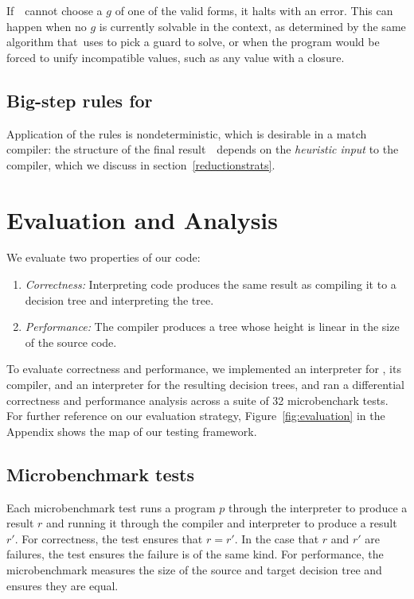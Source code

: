 \documentclass[runningheads]{llncs}
\begin{document}
    If~\Compile\ cannot choose a $g$ of one of the valid forms, it halts with an
    error. %
    This can happen when no $g$ is currently solvable in the context, as
    determined by the same algorithm that~\VMinus uses to pick a guard to solve,
    or when the program would be forced to unify incompatible values, such as
    any value with a closure. %

\subsection{Big-step rules for \Compile}

      \begingroup
      \compiler
      \endgroup

      Application of the rules is nondeterministic, which is desirable in a
      match compiler: the structure of the final result~\expr\ depends on the
      \textit{heuristic input} to the compiler, which we discuss in
      section~\ref{reductionstrats}. %


\section{Evaluation and Analysis}

We evaluate two properties of our code: 

\begin{enumerate}
  \item \textit{Correctness:} Interpreting \VMinus code produces the same result as
  compiling it to a decision tree and interpreting the tree. 
  \item \textit{Performance:} The compiler produces a tree whose height is
  linear in the size of the source code. 
\end{enumerate}


To evaluate correctness and performance, we implemented an interpreter for
\VMinus, its compiler, and an interpreter for the resulting decision trees, and
ran a differential correctness and performance analysis across a suite of 32
microbenchark tests. %
For further reference on our evaluation strategy, Figure~\ref{fig:evaluation} in
the Appendix shows the map of our testing framework. %

\subsection{Microbenchmark tests}

Each microbenchmark test runs a program $p$ through the \VMinus
interpreter to produce a result $r$ and running it through the \DTran compiler and
\D interpreter to produce a result $r'$. %
For correctness, the test ensures that $r = r'$. %
In the case that $r$ and $r'$ are failures, the test ensures the failure is of
the same kind. %
For performance, the microbenchmark measures the size of the source \iffibf and
target decision tree and ensures they are equal. %
\end{document}
